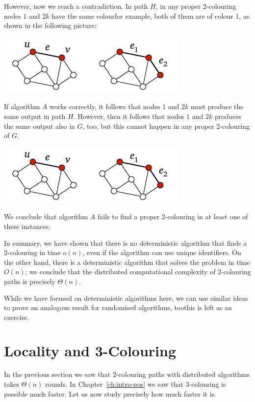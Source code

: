 However, now we reach a contradiction. In path $H$, in any proper $2$-colouring nodes $1$ and $2k$ have the same colour\mydash for example, both of them are of colour $1$, as shown in the following picture:
\begin{center}
    \includegraphics[page=\PIntroLbTwoD]{figs.pdf}
\end{center}
If algorithm $A$ works correctly, it follows that nodes $1$ and $2k$ must produce the same output in path $H$. However, then it follows that nodes $1$ and $2k$ produces the same output also in $G$, too, but this cannot happen in any proper $2$-colouring of $G$.
\begin{center}
    \includegraphics[page=\PIntroLbTwoE]{figs.pdf}
\end{center}
We conclude that algorithm $A$ fails to find a proper $2$-colouring in at least one of these instances.

In summary, we have shown that there is no deterministic algorithm that finds a $2$-colouring in time $o(n)$, even if the algorithm can use unique identifiers. On the other hand, there is a deterministic algorithm that solves the problem in time $O(n)$; we conclude that the distributed computational complexity of $2$-colouring paths is precisely $\Theta(n)$.

While we have focused on deterministic algorithms here, we can use similar ideas to prove an analogous result for randomised algorithms, too\mydash this is left as an exercise.


\section{Locality and 3-Colouring}\label{sec:intro-neg-logstar}

In the previous section we saw that $2$-colouring paths with distributed algorithms takes $\Theta(n)$ rounds. In Chapter~\ref{ch:intro-pos} we saw that $3$-colouring is possible much faster. Let us now study precisely how much faster it is.

